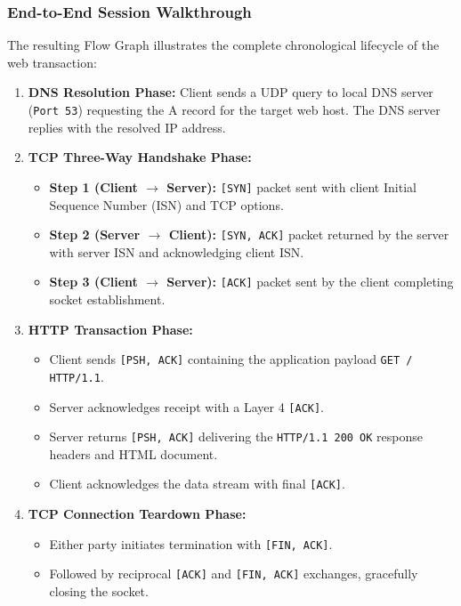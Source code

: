 \documentclass[12pt, a4paper]{article}
\begin{document}
\subsubsection{End-to-End Session Walkthrough}
The resulting Flow Graph illustrates the complete chronological lifecycle of the web transaction:
\begin{enumerate}
    \item \textbf{DNS Resolution Phase:} Client sends a UDP query to local DNS server (\texttt{Port 53}) requesting the A record for the target web host. The DNS server replies with the resolved IP address.
    \item \textbf{TCP Three-Way Handshake Phase:}
    \begin{itemize}
        \item \textbf{Step 1 (Client $\rightarrow$ Server):} \texttt{[SYN]} packet sent with client Initial Sequence Number (ISN) and TCP options.
        \item \textbf{Step 2 (Server $\rightarrow$ Client):} \texttt{[SYN, ACK]} packet returned by the server with server ISN and acknowledging client ISN.
        \item \textbf{Step 3 (Client $\rightarrow$ Server):} \texttt{[ACK]} packet sent by the client completing socket establishment.
    \end{itemize}
    \item \textbf{HTTP Transaction Phase:}
    \begin{itemize}
        \item Client sends \texttt{[PSH, ACK]} containing the application payload \texttt{GET / HTTP/1.1}.
        \item Server acknowledges receipt with a Layer 4 \texttt{[ACK]}.
        \item Server returns \texttt{[PSH, ACK]} delivering the \texttt{HTTP/1.1 200 OK} response headers and HTML document.
        \item Client acknowledges the data stream with final \texttt{[ACK]}.
    \end{itemize}
    \item \textbf{TCP Connection Teardown Phase:}
    \begin{itemize}
        \item Either party initiates termination with \texttt{[FIN, ACK]}.
        \item Followed by reciprocal \texttt{[ACK]} and \texttt{[FIN, ACK]} exchanges, gracefully closing the socket.
    \end{itemize}
\end{enumerate}
\end{document}
